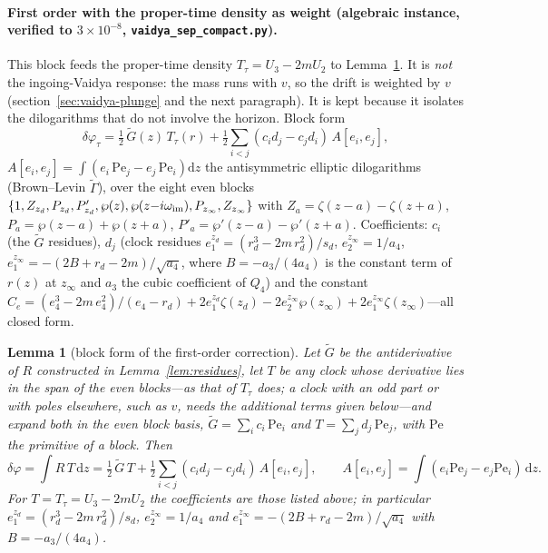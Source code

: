 \documentclass[12pt]{iopart}
\newcommand{\dd}{\mathrm{d}}
\theoremstyle{plain}
\theoremstyle{definition}
\theoremstyle{plain}
\newtheorem{auxlemma}{Lemma}
\theoremstyle{remark}
\begin{document}
\paragraph{First order with the proper-time density as weight (algebraic instance,
verified to $3\times10^{-8}$, \texttt{vaidya\_sep\_compact.py}).}
This block feeds the proper-time density $T_\tau=U_3-2mU_2$ to Lemma~\ref{lem:blocks}.
It is \emph{not} the ingoing-Vaidya response: the mass runs with $v$, so the drift is
weighted by $v$ (section~\ref{sec:vaidya-plunge} and the next paragraph). It is kept
because it isolates the dilogarithms that do not involve the horizon. Block form
\begin{equation}
\delta\varphi_\tau=\tfrac12\,\tilde G(z)\,T_\tau(r)
+\tfrac12\sum_{i<j}(c_i d_j-c_j d_i)\,A[e_i,e_j],
\end{equation}
$A[e_i,e_j]=\int(e_i\,\mathrm{Pe}_j-e_j\,\mathrm{Pe}_i)\dd z$ the antisymmetric
elliptic dilogarithms (Brown--Levin $\tilde\Gamma$), over the eight even blocks
$\{1,Z_{z_d},P_{z_d},P'_{z_d},\wp(z),\wp(z{-}i\omega_{\rm im}),P_{z_\infty},
Z_{z_\infty}\}$ with $Z_a=\zeta(z{-}a)-\zeta(z{+}a)$,
$P_a=\wp(z{-}a)+\wp(z{+}a)$, $P'_a=\wp'(z{-}a)-\wp'(z{+}a)$. Coefficients: $c_i$ (the
$\tilde G$ residues), $d_j$ (clock residues $e_1^{z_d}=(r_d^3-2m\,r_d^2)/s_d$,
$e_2^{z_\infty}=1/a_4$, $e_1^{z_\infty}=-(2B+r_d-2m)/\sqrt{a_4}$, where
$B=-a_3/(4a_4)$ is the constant term of $r(z)$ at $z_\infty$ and $a_3$ the cubic
coefficient of $Q_4$) and the constant
$C_e=(e_4^3-2m\,e_4^2)/(e_4-r_d)+2e_1^{z_d}\zeta(z_d)-2e_2^{z_\infty}\wp(z_\infty)
+2e_1^{z_\infty}\zeta(z_\infty)$---all closed form.

\begin{auxlemma}[block form of the first-order correction]\label{lem:blocks}
Let $\tilde G$ be the antiderivative of $R$ constructed in
Lemma~\ref{lem:residues}, let $T$ be any clock whose derivative lies in the span of the
even blocks---as that of $T_\tau$ does; a clock with an odd part or with poles elsewhere,
such as $v$, needs the additional terms given below---and expand both in the even block
basis, $\tilde G=\sum_ic_i\,\mathrm{Pe}_i$ and $T=\sum_jd_j\,\mathrm{Pe}_j$, with
$\mathrm{Pe}$ the primitive of a block. Then
\begin{equation}
   \delta\varphi=\int R\,T\,\dd z
   =\tfrac12\,\tilde G\,T+\tfrac12\sum_{i<j}(c_id_j-c_jd_i)\,A[e_i,e_j],
   \qquad A[e_i,e_j]=\int(e_i\mathrm{Pe}_j-e_j\mathrm{Pe}_i)\,\dd z .
   \label{eq:block-form}
\end{equation}
For $T=T_\tau=U_3-2mU_2$ the coefficients are those listed above; in particular
$e_1^{z_d}=(r_d^3-2m\,r_d^2)/s_d$, $e_2^{z_\infty}=1/a_4$ and
$e_1^{z_\infty}=-(2B+r_d-2m)/\sqrt{a_4}$ with $B=-a_3/(4a_4)$.
\end{auxlemma}
\end{document}

